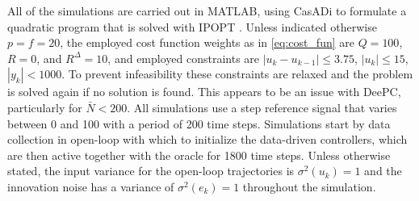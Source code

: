 All of the simulations are carried out in MATLAB, using CasADi \citep{Andersson2019} to formulate a quadratic program that is solved with IPOPT \citep{Wachter2006}. Unless indicated otherwise $p=f=20$, the employed cost function weights as in \eqref{eq:cost_fun} are $Q=100$, $R=0$, and $R^\Delta=10$, and employed constraints are $|u_k-u_{k-1}|\leq3.75$, $|u_k|\leq15$, $|y_k|<1000$. To prevent infeasibility these constraints are relaxed and the problem is solved again if no solution is found. This appears to be an issue with \ac{DeePC}, particularly for $\bar{N}<200$. All simulations use a step reference signal that varies between 0 and 100 with a period of 200 time steps. Simulations start by data collection in open-loop with which to initialize the data-driven controllers, which are then active together with the oracle for 1800 time steps. Unless otherwise stated, the input variance for the open-loop trajectories is $\sigma^2(u_k)=1$ and the innovation noise has a variance of $\sigma^2(e_k)=1$ throughout the simulation.
